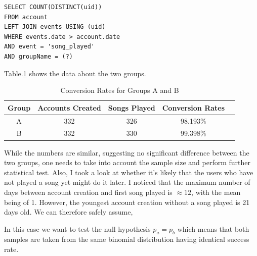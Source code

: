 \documentclass[paper=a4, fontsize=10pt]{report}
\begin{document}
\footnotesize
\begin{lstlisting}[frame=single,caption=Return conversion rates \label{code:sql_average_fixed_table}]
SELECT COUNT(DISTINCT(uid)) 
FROM account 
LEFT JOIN events USING (uid)
WHERE events.date > account.date
AND event = 'song_played'
AND groupName = (?)
\end{lstlisting}
\normalsize

Table.\ref{tab:conversion_rates} shows the data about the two groups.
\begin{table}[htbp]
\normalsize

  \centering
  \caption{Conversion Rates for Groups A and B}
    \begin{tabular}{ccccc}
    \toprule
    \textbf{Group } & \textbf{Accounts Created} & \textbf{Songs Played} & \textbf{Conversion Rates} \\
    \midrule
    A & 332  &  326  & 98.193\%  \\
    B & 332   & 330   & 99.398\%   \\
    \bottomrule
    \end{tabular}%
  \label{tab:conversion_rates}%
\end{table}%
\normalsize
While the numbers are similar, suggesting no significant difference between the two groups, one needs to take into account the sample size and perform
further statistical test. Also, I took a look at whether it's likely that the users who have not played a song yet might
do it later. I noticed that the maximum number of days between account creation and first song played is $\approx 12$, with the mean
being of 1. However, the youngest account creation without a song played is 21 days old. We can therefore safely assume,


In this case we want to test the null hypothesis $p_{a} = p_{b}$ which means that both samples are taken from the same binomial distribution having identical
success rate.
\end{document}
